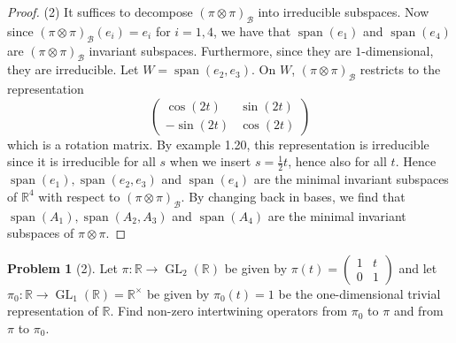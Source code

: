 \documentclass[reqno]{amsart}
\theoremstyle{definition}
\newtheorem{problem}[theorem]{Problem}
\theoremstyle{remark}
\DeclareMathOperator{\Span}{span}
\DeclareMathOperator{\GL}{GL}
\begin{document}
\begin{proof}
        (2) 
        It suffices to decompose
        $\left( \pi \otimes \pi \right)_{\mathcal{B}}$ into
        irreducible subspaces. Now
        since  $\left( \pi \otimes \pi \right)_{\mathcal{B}}
        (e_i) = e_i$ for $i = 1,4$, we have that
        $\Span (e_1)$ and $\Span (e_4)$ are
        $\left( \pi \otimes \pi \right)_{\mathcal{B}}$ 
        invariant subspaces. Furthermore, since
        they are $1$-dimensional, they are irreducible.
        Let $W =
        \Span (e_2, e_3)$. On
        $W$, $\left( \pi \otimes \pi \right)_{\mathcal{B}}$ 
        restricts to the representation
        \[
            \begin{pmatrix} \cos (2t) & \sin (2t)\\
            - \sin (2t) & \cos (2t) \end{pmatrix} 
        \] 
        which is a rotation matrix. By example 1.20,
        this representation is irreducible since it is
        irreducible for all $s$ when
        we insert $s = \frac{1}{2}t$, hence also for all $t$.
        Hence
        $\Span (e_1), 
        \Span (e_2, e_3)$ and
        $\Span(e_4)$ are the minimal invariant
        subspaces of 
        $\mathbb{R}^{4}$ with respect to
        $\left( \pi \otimes \pi \right)_{\mathcal{B}}$.
        By changing back in bases,
        we find that
        $\Span(A_1), \Span(A_2,A_3)$ and
        $\Span(A_4)$ are the minimal invariant
        subspaces of $\pi \otimes \pi$.
    \end{proof}


    \begin{problem}[2]
        Let $\pi \colon \mathbb{R} \to \GL_2 (\mathbb{R})$ be
        given by
        $\pi(t) = \begin{pmatrix} 1 & t \\ 0 & 1 \end{pmatrix} $ and
        let $\pi_0 \colon \mathbb{R} \to 
        \GL_1 (\mathbb{R}) = \mathbb{R}^{\times }$ be
        given by $\pi_0(t) = 1$ be the one-dimensional
        trivial representation of $\mathbb{R}$. Find non-zero
        intertwining operators from
        $\pi_0$ to $\pi$ and from $\pi$ to $\pi_0$.
    \end{problem}
\end{document}
